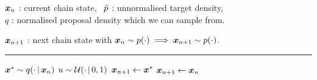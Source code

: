\begin{algorithmic}
\small
    \Require
    $\boldsymbol{x}_n$ : current chain state,~
    $\tilde{p}$ : unnormalised target density,\\
    $q$ : normalised proposal density which we can sample from.
    \Ensure\raggedright
    $\boldsymbol{x}_{n+1}$ : next chain state with $\boldsymbol{x}_n \sim p(\cdot) \implies \boldsymbol{x}_{n+1} \sim p(\cdot)$.
\end{algorithmic}
\hrule
\small
\begin{algorithmic}[1]
  \State $\boldsymbol{x}^* \sim q(\cdot \operatorname{|} \boldsymbol{x}_{n})$ 
  \State $u \sim \mathcal{U}(\cdot \operatorname{|} 0,1)$
  \vspace{0.2mm}
    \vspace{0.1mm}
    \State $\boldsymbol{x}_{n+1} \gets \boldsymbol{x}^*$ 
  \Else
    \State $\boldsymbol{x}_{n+1} \gets \boldsymbol{x}_{n}$ 
  \EndIf
\end{algorithmic}
